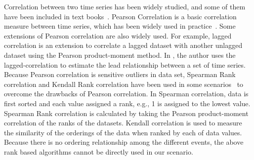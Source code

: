 Correlation between two time series has been widely studied, and some of them have been included in text books~\cite{johnson2002applied}. Pearson Correlation \cite{nagelkerke1991note} is a basic correlation measure between time series, which has been widely used in practice~\cite{Zhu:VLDB:2002}. Some extensions of Pearson correlation are also widely used. For example, lagged correlation is an extension to correlate a lagged dataset with another unlagged dataset using the Pearson product-moment method. In \cite{wu2010detecting}, the author uses the lagged-correlation to estimate the lead relationship between a set of time series. Because Pearson correlation is sensitive outliers in data set, Spearman Rank correlation and Kendall Rank correlation have been used in some scenarios~\cite{Lehman:SAS:2005} to overcome the drawbacks of Pearson correlation. In Spearman correlation, data is first sorted and each value assigned a rank, e.g., 1 is assigned to the lowest value. Spearman Rank correlation is calculated by taking the Pearson product-moment correlation of the ranks of the datasets. Kendall correlation is used to measure the similarity of the orderings of the data when ranked by each of data values. Because there is no ordering relationship among the different events, the above rank based algorithms cannot be directly used in our scenario.
